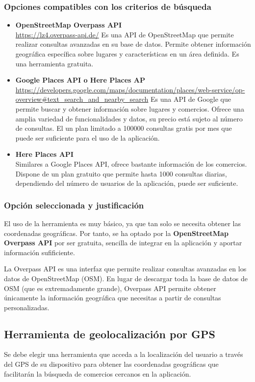 \subsubsection{Opciones compatibles con los criterios de búsqueda}
\begin{itemize}
    \item \textbf{OpenStreetMap Overpass API}\\\url{https://lz4.overpass-api.de/}
    Es una API de OpenStreetMap que permite realizar consultas avanzadas en su base de datos. Permite obtener información geográfica específica sobre lugares y características en un área definida. Es una herramienta gratuita.
    \item \textbf{Google Places API o Here Places AP}\\\url{https://developers.google.com/maps/documentation/places/web-service/op-overview#text_search_and_nearby_search}
    Es una API de Google que permite buscar y obtener información sobre lugares y comercios. Ofrece una amplia variedad de funcionalidades y datos, su precio está sujeto al número de consultas. El un plan limitado a 100000 consultas gratis por mes que puede ser suficiente para el uso de la aplicación.
    \item \textbf{Here Places API}\\
    Similares a Google Places API, ofrece bastante información de los comercios. Dispone de un plan gratuito que permite hasta 1000 consultas diarias, dependiendo del número de usuarios de la aplicación, puede ser suficiente.
\end{itemize}

\subsubsection{Opción seleccionada y justificación}
El uso de la herramienta es muy básico, ya que tan solo se necesita obtener las coordenadas geográficas. Por tanto, se ha optado por la \textbf{OpenStreetMap Overpass API} por ser gratuita, sencilla de integrar en la aplicación y aportar información sufificiente.

La Overpass API es una interfaz que permite realizar consultas avanzadas en los datos de OpenStreetMap (OSM). En lugar de descargar toda la base de datos de OSM (que es extremadamente grande), Overpass API permite obtener únicamente la información geográfica que necesitas a partir de consultas personalizadas.


\subsection{Herramienta de geolocalización por GPS}
Se debe elegir una herramienta que acceda a la localización del usuario a través del GPS de su dispositivo para obtener las coordenadas geográficas que facilitarán la búsqueda de comercios cercanos en la aplicación. 

